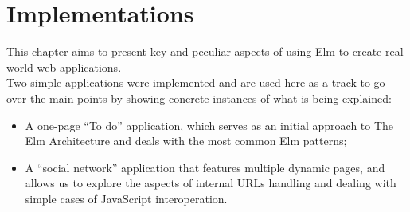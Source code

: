 \chapter{Implementations}

This chapter aims to present key and peculiar aspects of using Elm to create real world web applications.\\

Two simple applications were implemented and are used here as a track to go over the main points by showing concrete instances of what is being explained:
\begin{itemize}
    \item A one-page ``To do'' application, which serves as an initial approach to The Elm Architecture and deals with the most common Elm patterns;
    \item A ``social network'' application that features multiple dynamic pages, and allows us to explore the aspects of internal URLs handling and dealing with simple cases of JavaScript interoperation.
\end{itemize}



